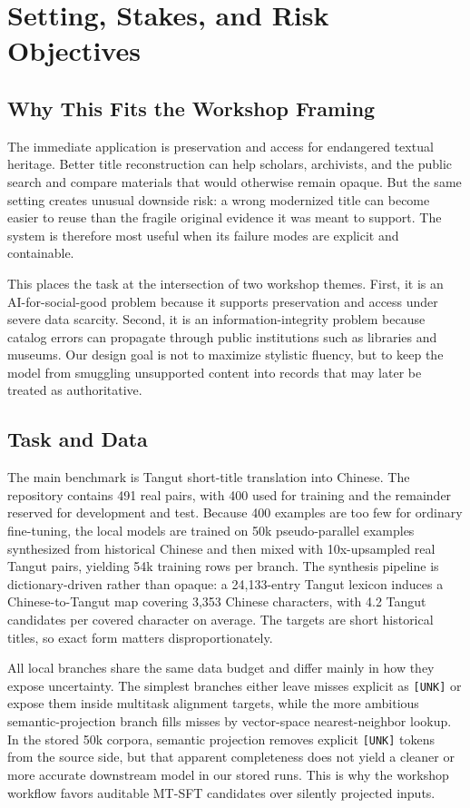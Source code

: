 \documentclass{article}
\begin{document}
\section{Setting, Stakes, and Risk Objectives}

\subsection{Why This Fits the Workshop Framing}

The immediate application is preservation and access for endangered textual heritage. Better title reconstruction can help scholars, archivists, and the public search and compare materials that would otherwise remain opaque. But the same setting creates unusual downside risk: a wrong modernized title can become easier to reuse than the fragile original evidence it was meant to support. The system is therefore most useful when its failure modes are explicit and containable.

This places the task at the intersection of two workshop themes. First, it is an AI-for-social-good problem because it supports preservation and access under severe data scarcity. Second, it is an information-integrity problem because catalog errors can propagate through public institutions such as libraries and museums. Our design goal is not to maximize stylistic fluency, but to keep the model from smuggling unsupported content into records that may later be treated as authoritative.

\subsection{Task and Data}

The main benchmark is Tangut short-title translation into Chinese. The repository contains 491 real pairs, with 400 used for training and the remainder reserved for development and test. Because 400 examples are too few for ordinary fine-tuning, the local models are trained on 50k pseudo-parallel examples synthesized from historical Chinese and then mixed with 10x-upsampled real Tangut pairs, yielding 54k training rows per branch. The synthesis pipeline is dictionary-driven rather than opaque: a 24,133-entry Tangut lexicon induces a Chinese-to-Tangut map covering 3,353 Chinese characters, with 4.2 Tangut candidates per covered character on average. The targets are short historical titles, so exact form matters disproportionately.

All local branches share the same data budget and differ mainly in how they expose uncertainty. The simplest branches either leave misses explicit as \texttt{[UNK]} or expose them inside multitask alignment targets, while the more ambitious semantic-projection branch fills misses by vector-space nearest-neighbor lookup. In the stored 50k corpora, semantic projection removes explicit \texttt{[UNK]} tokens from the source side, but that apparent completeness does not yield a cleaner or more accurate downstream model in our stored runs. This is why the workshop workflow favors auditable MT-SFT candidates over silently projected inputs.
\end{document}
